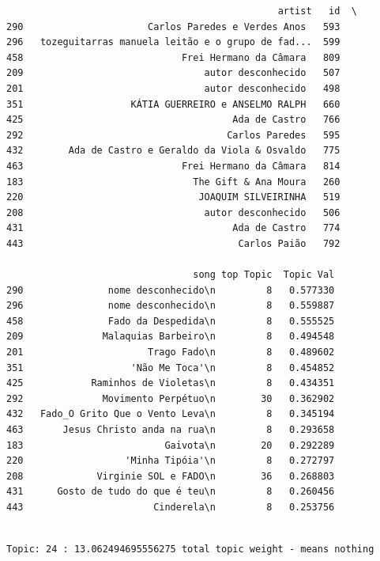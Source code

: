 \documentclass[11pt]{article}
\begin{document}
    
    \begin{verbatim}
                                                artist   id  \
290                      Carlos Paredes e Verdes Anos   593   
296   tozeguitarras manuela leitão e o grupo de fad...  599   
458                            Frei Hermano da Câmara   809   
209                                autor desconhecido   507   
201                                autor desconhecido   498   
351                   KÁTIA GUERREIRO e ANSELMO RALPH   660   
425                                     Ada de Castro   766   
292                                    Carlos Paredes   595   
432        Ada de Castro e Geraldo da Viola & Osvaldo   775   
463                            Frei Hermano da Câmara   814   
183                              The Gift & Ana Moura   260   
220                               JOAQUIM SILVEIRINHA   519   
208                                autor desconhecido   506   
431                                     Ada de Castro   774   
443                                      Carlos Paião   792   

                                 song top Topic  Topic Val  
290               nome desconhecido\n         8   0.577330  
296               nome desconhecido\n         8   0.559887  
458               Fado da Despedida\n         8   0.555525  
209              Malaquias Barbeiro\n         8   0.494548  
201                      Trago Fado\n         8   0.489602  
351                   'Não Me Toca'\n         8   0.454852  
425            Raminhos de Violetas\n         8   0.434351  
292              Movimento Perpétuo\n        30   0.362902  
432   Fado_O Grito Que o Vento Leva\n         8   0.345194  
463       Jesus Christo anda na rua\n         8   0.293658  
183                         Gaivota\n        20   0.292289  
220                  'Minha Tipóia'\n         8   0.272797  
208             Virginie SOL e FADO\n        36   0.268803  
431      Gosto de tudo do que é teu\n         8   0.260456  
443                       Cinderela\n         8   0.253756  
    \end{verbatim}

    
    \begin{Verbatim}[commandchars=\\\{\}]

Topic: 24 : 13.062494695556275 total topic weight - means nothing

    \end{Verbatim}
\end{document}
